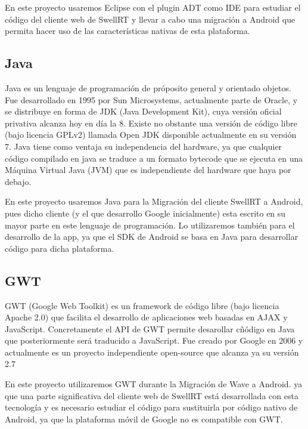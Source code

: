 	En este proyecto usaremos Eclipse con el plugin ADT como IDE para estudiar el código del cliente web de SwellRT y llevar a cabo una migración a Android que permita hacer uso de las características nativas de esta plataforma.
    
    \subsection{Java}\label{ssec:java}
    
	Java \cite{ref:java} es un lenguaje de programación de próposito general y orientado objetos. Fue desarrollado en 1995 por Sun Microsystems, actualmente parte de Oracle, y se distribuye en forma de JDK (Java Development Kit), cuya versión oficial privativa alcanza hoy en día la 8. Existe no obstante una versión de código libre (bajo licencia GPLv2) llamada Open JDK \cite{ref:openjdk} disponible actualmente en su versión 7. Java tiene como ventaja su independencia del hardware, ya que cualquier código compilado en java se traduce a un formato bytecode que se ejecuta en una Máquina Virtual Java (JVM) que es independiente del hardware que haya por debajo.
	
	En este proyecto usaremos Java para la Migración del cliente SwellRT a Android, pues dicho cliente (y el que desarrollo Google inicialmente) esta escrito en su mayor parte en este lenguaje de programación. Lo utilizaremos también para el desarrollo de la app, ya que el SDK de Android se basa en Java para desarrollar código para dicha plataforma.
    
    \subsection{GWT}\label{ssec:gwt}
    
	GWT \cite{ref:gwt} (Google Web Toolkit) es un framework de código libre (bajo licencia Apache 2.0) que facilita el desarrollo de aplicaciones web basadas en AJAX y JavaScript. Concretamente el API de GWT permite desarollar cñódigo en Java que posteriormente será traducido a JavaScript. Fue creado por Google en 2006 y actualmente es un proyecto independiente open-source que alcanza ya su versión 2.7
	
	En este proyecto utilizaremos GWT durante la Migración de Wave a Android. ya que una parte significativa del cliente web de SwellRT está desarrollada con esta tecnología y es necesario estudiar el código para sustituirla por código nativo de Android, ya que la plataforma móvil de Google no es compatible con GWT.
    
